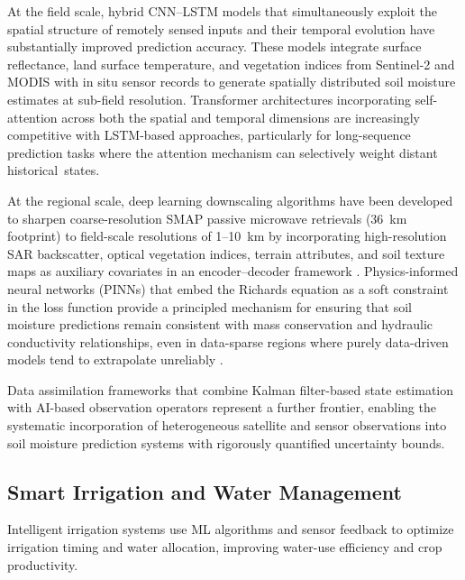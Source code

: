 \documentclass[land,review,accept,pdftex,oneauthor]{Definitions/mdpi}
\begin{document}
At the field scale, hybrid CNN--LSTM models that simultaneously exploit the spatial structure of remotely sensed inputs and their temporal evolution have substantially improved prediction accuracy. These models integrate surface reflectance, land surface temperature, and vegetation indices from Sentinel-2 and MODIS with in situ sensor records to generate spatially distributed soil moisture estimates at sub-field resolution. Transformer architectures incorporating self-attention across both the spatial and temporal dimensions are increasingly competitive with LSTM-based approaches, particularly for long-sequence prediction tasks where the attention mechanism can selectively weight distant historical~states.

At the regional scale, deep learning downscaling algorithms have been developed to sharpen coarse-resolution SMAP passive microwave retrievals (36~km footprint) to field-scale resolutions of 1--10~km by incorporating high-resolution SAR backscatter, optical vegetation indices, terrain attributes, and soil texture maps as auxiliary covariates in an encoder--decoder framework \citep{Fang2017}. Physics-informed neural networks (PINNs) that embed the Richards equation as a soft constraint in the loss function provide a principled mechanism for ensuring that soil moisture predictions remain consistent with mass conservation and hydraulic conductivity relationships, even in data-sparse regions where purely data-driven models tend to extrapolate unreliably \citep{Karniadakis2021,Cuomo2022}.

Data assimilation frameworks that combine Kalman filter-based state estimation with AI-based observation operators represent a further frontier, enabling the systematic incorporation of heterogeneous satellite and sensor observations into soil moisture prediction systems with rigorously quantified uncertainty bounds.

\subsection{Smart Irrigation and Water Management}\label{sec5.2}

Intelligent irrigation systems use ML algorithms and sensor feedback to optimize irrigation timing and water allocation, improving water-use efficiency and crop productivity.
\end{document}
